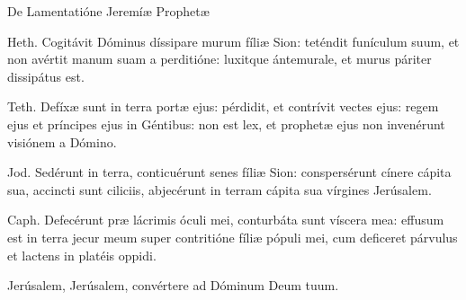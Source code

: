 
De Lamentatióne Jeremíæ Prophetæ

Heth. 
Cogitávit Dóminus díssipare murum fíliæ Sion: teténdit funículum suum, et non avértit manum suam a perditióne: luxitque ántemurale, et murus páriter dissipátus est.

Teth. 
Defíxæ sunt in terra portæ ejus: pérdidit, et contrívit vectes ejus: regem ejus et príncipes ejus in Géntibus: non est lex, et prophetæ ejus non invenérunt visiónem a Dómino.

Jod. 
Sedérunt in terra, conticuérunt senes fíliæ Sion: conspersérunt cínere cápita sua, accincti sunt ciliciis, abjecérunt in terram cápita sua vírgines Jerúsalem.

Caph. 
Defecérunt præ lácrimis óculi mei, conturbáta sunt víscera mea: effusum est in terra jecur meum super contritióne fíliæ pópuli mei, cum deficeret párvulus et lactens in platéis oppidi.

Jerúsalem, Jerúsalem, convértere ad Dóminum Deum tuum.
\par